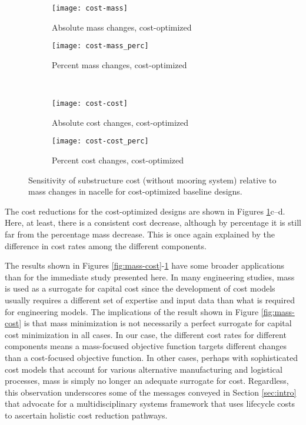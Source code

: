 \begin{figure}[htb]
  \begin{subfigure}[b]{0.49\linewidth}
    \centering \texttt{[image: cost-mass]}
    \caption{Absolute mass changes, cost-optimized}
  \end{subfigure}
  \begin{subfigure}[b]{0.49\linewidth}
    \centering \texttt{[image: cost-mass\_perc]}
    \caption{Percent mass changes, cost-optimized}
  \end{subfigure}\\
  \begin{subfigure}[b]{0.49\linewidth}
    \centering \texttt{[image: cost-cost]}
    \caption{Absolute cost changes, cost-optimized}
  \end{subfigure}
  \begin{subfigure}[b]{0.49\linewidth}
    \centering \texttt{[image: cost-cost\_perc]}
    \caption{Percent cost changes, cost-optimized}
  \end{subfigure}
  \caption{Sensitivity of substructure cost (without mooring system)
    relative to mass changes in nacelle for cost-optimized baseline designs.}
  \label{fig:cost-cost}
\end{figure}

The cost reductions for the cost-optimized designs are shown in Figures
\ref{fig:cost-cost}c--d.  Here, at least, there is a consistent cost
decrease, although by percentage it is still far
from the percentage mass decrease.  This is once again explained by the
difference in cost rates among the different components.

The results shown in Figures \ref{fig:mass-cost}-\ref{fig:cost-cost}
have some broader applications than for the immediate study presented
here.  In many engineering studies, mass is used as a surrogate for
capital cost since the development of cost models usually requires a
different set of expertise and input data than what is required for
engineering models.  The implications of the result shown in
Figure \ref{fig:mass-cost} is that mass minimization is not necessarily
a perfect surrogate for capital cost minimization in all cases.  In our
case, the different cost rates for different components means a
mass-focused objective function targets different changes than a
cost-focused objective function.  In other cases, perhaps with
sophisticated cost models that account for various alternative
manufacturing and logistical processes, mass is simply no longer an
adequate surrogate for cost.  Regardless, this observation underscores
some of the messages conveyed in Section \ref{sec:intro} that
advocate for a multidisciplinary systems framework that uses lifecycle
costs to ascertain holistic cost reduction pathways.


